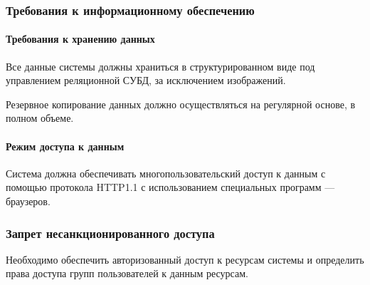 \subsubsection{Требования к информационному обеспечению}


\paragraph{Требования к хранению данных}
Все данные системы должны храниться в структурированном виде под управлением реляционной СУБД, за исключением изображений.

Резервное копирование данных должно осуществляться на регулярной основе, в полном объеме.

\paragraph{Режим доступа к данным}

Система должна обеспечивать многопользовательский доступ к данным с помощью протокола HTTP1.1 с использованием специальных программ --- браузеров.


\subsubsection{Запрет несанкционированного доступа}

Необходимо обеспечить авторизованный доступ к ресурсам системы и определить права доступа групп пользователей к данным ресурсам.

